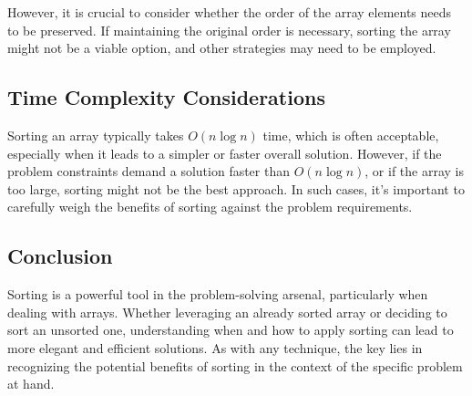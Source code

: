 However, it is crucial to consider whether the order of the array elements needs to be preserved. If maintaining the original order is necessary, sorting the array might not be a viable option, and other strategies may need to be employed.

\subsection*{Time Complexity Considerations}

Sorting an array typically takes \(O(n \log n)\) time, which is often acceptable, especially when it leads to a simpler or faster overall solution. However, if the problem constraints demand a solution faster than \(O(n \log n)\), or if the array is too large, sorting might not be the best approach. In such cases, it's important to carefully weigh the benefits of sorting against the problem requirements.

\subsection*{Conclusion}

Sorting is a powerful tool in the problem-solving arsenal, particularly when dealing with arrays. Whether leveraging an already sorted array or deciding to sort an unsorted one, understanding when and how to apply sorting can lead to more elegant and efficient solutions. As with any technique, the key lies in recognizing the potential benefits of sorting in the context of the specific problem at hand.